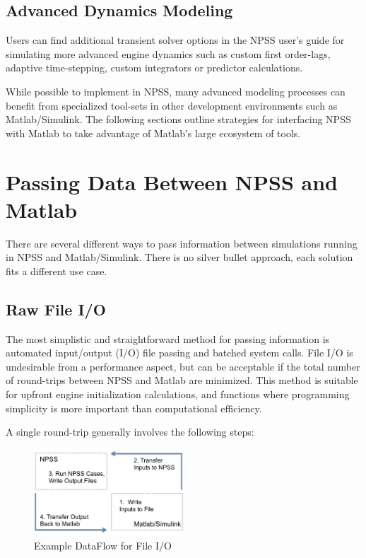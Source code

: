\documentclass[heading.tex]{subfiles}
\begin{document}
\subsection{Advanced Dynamics Modeling}

Users can find additional transient solver options in the NPSS user's guide
\cite[chap.~18]{NPSS} for simulating
more advanced engine dynamics such as custom first order-lags,
adaptive time-stepping, custom integrators or predictor calculations.

While possible to implement in NPSS, many advanced modeling processes can benefit
from specialized tool-sets in other development environments such as Matlab/Simulink.
The following sections outline strategies for interfacing NPSS
with Matlab to take advantage of Matlab's large ecosystem of tools.

\section{Passing Data Between NPSS and Matlab}

There are several different ways to pass information between simulations
running in NPSS and Matlab/Simulink. There is no silver bullet approach,
each solution fits a different use case.

\subsection{Raw File I/O}

The most simplistic and straightforward method for passing information is automated
input/output (I/O) file passing and batched system calls.
File I/O is undesirable from a performance aspect,
but can be acceptable if the total number of round-trips between
NPSS and Matlab are minimized.
This method is suitable for upfront engine initialization calculations, 
and functions where programming simplicity is more important than computational efficiency.

A single round-trip generally involves the following steps:

\begin{figure}[H]
\centering
\includegraphics[width=0.5\textwidth]{images/roundTrip}
\caption{Example DataFlow for File I/O}
\label{f:roundTrip}
\end{figure}
\end{document}
